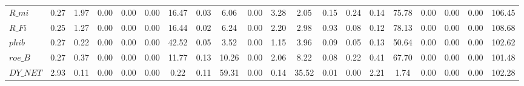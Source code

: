 \begin{center}
\begin{longtable}{lccccccccccccccccccc}
$R\_mi                      $	 & 	                0.27	 & 	                1.97	 & 	                0.00	 & 	                0.00	 & 	                0.00	 & 	               16.47	 & 	                0.03	 & 	                6.06	 & 	                0.00	 & 	                3.28	 & 	                2.05	 & 	                0.15	 & 	                0.24	 & 	                0.14	 & 	               75.78	 & 	                0.00	 & 	                0.00	 & 	                0.00	 & 	              106.45 \\ 
$R\_Fi                      $	 & 	                0.25	 & 	                1.27	 & 	                0.00	 & 	                0.00	 & 	                0.00	 & 	               16.44	 & 	                0.02	 & 	                6.24	 & 	                0.00	 & 	                2.20	 & 	                2.98	 & 	                0.93	 & 	                0.08	 & 	                0.12	 & 	               78.13	 & 	                0.00	 & 	                0.00	 & 	                0.00	 & 	              108.68 \\ 
$phib                       $	 & 	                0.27	 & 	                0.22	 & 	                0.00	 & 	                0.00	 & 	                0.00	 & 	               42.52	 & 	                0.05	 & 	                3.52	 & 	                0.00	 & 	                1.15	 & 	                3.96	 & 	                0.09	 & 	                0.05	 & 	                0.13	 & 	               50.64	 & 	                0.00	 & 	                0.00	 & 	                0.00	 & 	              102.62 \\ 
$roe\_B                     $	 & 	                0.27	 & 	                0.37	 & 	                0.00	 & 	                0.00	 & 	                0.00	 & 	               11.77	 & 	                0.13	 & 	               10.26	 & 	                0.00	 & 	                2.06	 & 	                8.22	 & 	                0.08	 & 	                0.22	 & 	                0.41	 & 	               67.70	 & 	                0.00	 & 	                0.00	 & 	                0.00	 & 	              101.48 \\ 
$DY\_NET                    $	 & 	                2.93	 & 	                0.11	 & 	                0.00	 & 	                0.00	 & 	                0.00	 & 	                0.22	 & 	                0.11	 & 	               59.31	 & 	                0.00	 & 	                0.14	 & 	               35.52	 & 	                0.01	 & 	                0.00	 & 	                2.21	 & 	                1.74	 & 	                0.00	 & 	                0.00	 & 	                0.00	 & 	              102.28 \\ 

\end{longtable}
\end{center}
